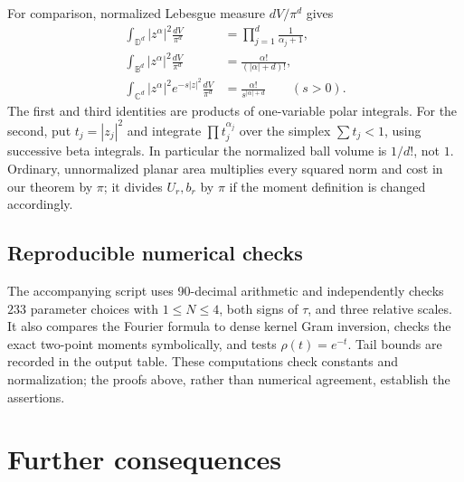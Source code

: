 \documentclass[12pt]{amsart}
\theoremstyle{definition}
\theoremstyle{remark}
\numberwithin{equation}{section}
\newcommand{\C}{\mathbb{C}}
\newcommand{\D}{\mathbb{D}}
\theoremstyle{definition}
\begin{document}
For comparison, normalized Lebesgue measure $dV/\pi^d$ gives
\begin{equation}\label{en:modelnorms}
\begin{aligned}
 \int_{\D^d}|z^\alpha|^2\frac{dV}{\pi^d}
   &=\prod_{j=1}^d\frac1{\alpha_j+1},\\
 \int_{\mathbb B^d}|z^\alpha|^2\frac{dV}{\pi^d}
   &=\frac{\alpha!}{(|\alpha|+d)!},\\
 \int_{\C^d}|z^\alpha|^2e^{-s|z|^2}\frac{dV}{\pi^d}
   &=\frac{\alpha!}{s^{|\alpha|+d}}\qquad(s>0).
\end{aligned}
\end{equation}
The first and third identities are products of one-variable polar
integrals. For the second, put $t_j=|z_j|^2$ and integrate
$\prod t_j^{\alpha_j}$ over the simplex $\sum t_j<1$, using successive
beta integrals. In particular the normalized ball volume is $1/d!$,
not $1$. Ordinary, unnormalized planar area multiplies every squared
norm and cost in our theorem by $\pi$; it divides $U_r,b_r$ by $\pi$
if the moment definition is changed accordingly.

\subsection{Reproducible numerical checks}
The accompanying script uses 90-decimal arithmetic and independently
checks $233$ parameter choices with $1\le N\le4$, both signs of
$\tau$, and three relative scales. It also compares the Fourier
formula to dense kernel Gram inversion, checks the exact two-point
moments symbolically, and tests $\rho(t)=e^{-t}$. Tail bounds are
recorded in the output table. These computations check constants and
normalization; the proofs above, rather than numerical agreement,
establish the assertions.

\section{Further consequences}
\end{document}
